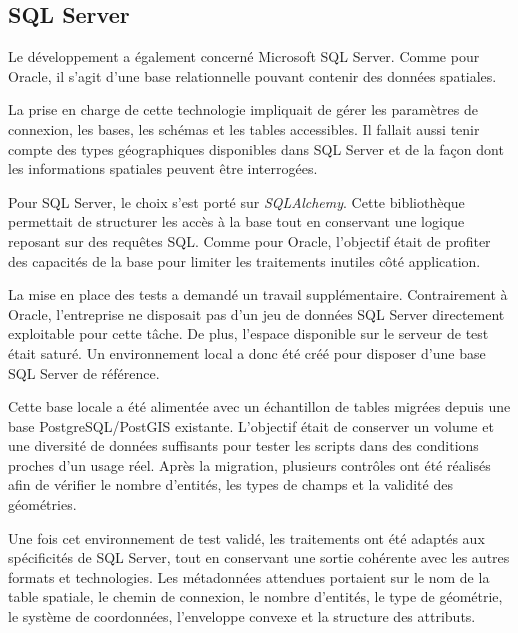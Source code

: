 
\subsection{SQL Server}
\label{subsec:sql_server}

Le développement a également concerné Microsoft SQL Server. Comme pour Oracle,
il s'agit d'une base relationnelle pouvant contenir des données spatiales.

La prise en charge de cette technologie impliquait de gérer les paramètres de
connexion, les bases, les schémas et les tables accessibles. Il fallait aussi
tenir compte des types géographiques disponibles dans SQL Server et de la façon
dont les informations spatiales peuvent être interrogées.

Pour SQL Server, le choix s'est porté sur \textit{SQLAlchemy}. Cette bibliothèque
permettait de structurer les accès à la base tout en conservant une logique
reposant sur des requêtes SQL. Comme pour Oracle, l'objectif était de profiter
des capacités de la base pour limiter les traitements inutiles côté application.

La mise en place des tests a demandé un travail supplémentaire. Contrairement à
Oracle, l'entreprise ne disposait pas d'un jeu de données SQL Server directement
exploitable pour cette tâche. De plus, l'espace disponible sur le serveur de
test était saturé. Un environnement local a donc été créé pour disposer d'une
base SQL Server de référence.

Cette base locale a été alimentée avec un échantillon de tables migrées depuis
une base PostgreSQL/PostGIS existante. L'objectif était de conserver un volume
et une diversité de données suffisants pour tester les scripts dans des
conditions proches d'un usage réel. Après la migration, plusieurs contrôles ont
été réalisés afin de vérifier le nombre d'entités, les types de champs et la
validité des géométries.

Une fois cet environnement de test validé, les traitements ont été adaptés aux
spécificités de SQL Server, tout en conservant une sortie cohérente avec les
autres formats et technologies. Les métadonnées attendues portaient sur le nom de la table
spatiale, le chemin de connexion, le nombre d'entités, le type de géométrie, le
système de coordonnées, l'enveloppe convexe et la structure des attributs.

